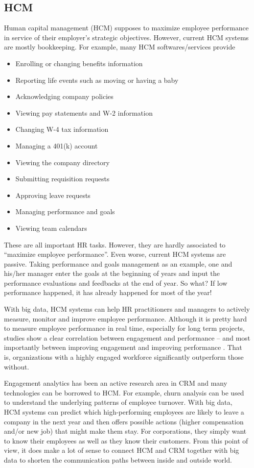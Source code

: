 \documentclass[12pt]{book}
\begin{document}
\subsection{HCM}
Human capital management (HCM) supposes to maximize employee performance in service of their employer's strategic objectives. However, current HCM systems are mostly bookkeeping. For example, many HCM softwares/services provide \cite{AdpHcm}
\begin{itemize}
\item Enrolling or changing benefits information
\item Reporting life events such as moving or having a baby
\item Acknowledging company policies
\item Viewing pay statements and W-2 information
\item Changing W-4 tax information
\item Managing a 401(k) account
\item Viewing the company directory
\item Submitting requisition requests
\item Approving leave requests
\item Managing performance and goals
\item Viewing team calendars
\end{itemize}
These are all important HR tasks. However, they are hardly associated to ``maximize employee performance''. Even worse, current HCM systems are passive. Taking performance and goals management as an example, one and his/her manager enter the goals at the beginning of years and input the performance evaluations and feedbacks at the end of year. So what? If low performance happened, it has already happened for most of the year!

With big data, HCM systems can help HR practitioners and managers to actively measure, monitor and improve employee performance. Although it is pretty hard to measure employee performance in real time, especially for long term projects, studies show a clear correlation between engagement and performance -- and most importantly between improving engagement and improving performance \cite{MacLeodClarke2012}. That is, organizations with a highly engaged workforce significantly outperform those without.

Engagement analytics has been an active research area in CRM and many technologies can be borrowed to HCM. For example, churn analysis can be used to understand the underlying patterns of employee turnover. With big data, HCM systems can predict which high-performing employees are likely to leave a company in the next year and then offers possible actions (higher compensation and/or new job) that might make them stay. For corporations, they simply want to know their employees as well as they know their customers.  From this point of view, it does make a lot of sense to connect HCM and CRM together with big data to shorten the communication paths between inside and outside world.
\end{document}
